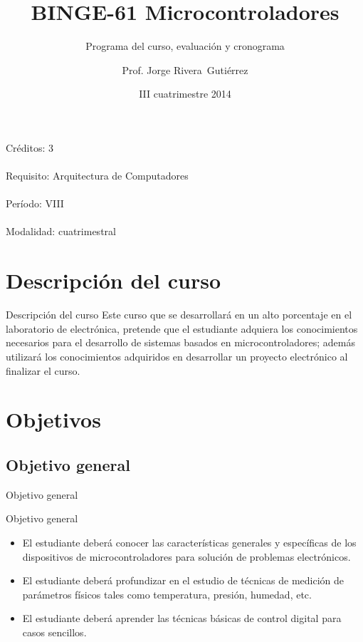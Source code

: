 \documentclass[xcolor=dvipsnames]{beamer}
\title[$\mu C$]{BINGE-61 Microcontroladores}
\subtitle{Programa del curso, evaluación y cronograma}
\author{Prof. Jorge Rivera~Guti\'errez}
\institute{Universidad Latina de Costa Rica\\ Ingenier\'\i a en Electr\'onica}
\date{III cuatrimestre 2014}
\newcommand{\pageframe}[1]{\frame{\begin{center}{ \Huge #1 }\end{center}}}
\begin{document}
\begin{frame}
 \maketitle
\end{frame}

\begin{frame}
 \begin{center}
  \Large Créditos: 3\\~\\
  Requisito: Arquitectura de Computadores\\~\\
  Período: VIII\\~\\
  Modalidad: cuatrimestral
 \end{center}
\end{frame}

\section{Descripción del curso}

\begin{frame}{Descripción del curso}
 Este curso  que se desarrollar\'a en un alto porcentaje en el laboratorio de electr\'onica, pretende que el estudiante adquiera los conocimientos necesarios para el desarrollo de sistemas basados en microcontroladores; adem\'as utilizar\'a los conocimientos adquiridos en desarrollar un proyecto electr\'onico al finalizar el curso.
\end{frame}

\section{Objetivos}

\pageframe{Objetivos}

\subsection{Objetivo general}

\begin{frame}{Objetivo general}
  \begin{block}{Objetivo general}
    \begin{itemize}
      \item El estudiante deberá conocer las características generales y específicas de los dispositivos de microcontroladores para solución de problemas electrónicos.
      \item El estudiante deberá profundizar en el estudio de técnicas de medición de parámetros físicos tales como temperatura, presión, humedad, etc.
      \item El estudiante deberá aprender las técnicas básicas de control digital para casos sencillos.
    \end{itemize}
  \end{block}
\end{frame}
\end{document}

